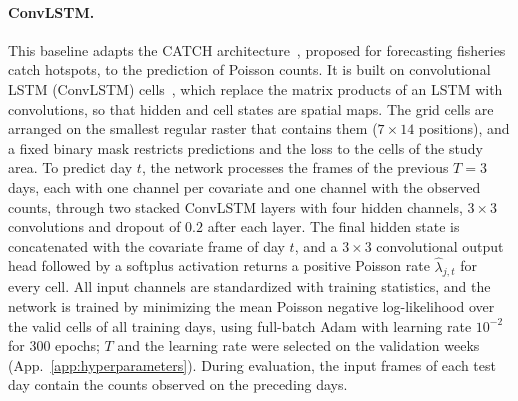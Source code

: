 \paragraph{ConvLSTM.}
This baseline adapts the CATCH architecture~\citep{agmata2025catch}, proposed for forecasting fisheries catch hotspots, to the prediction of Poisson counts. It is built on convolutional LSTM (ConvLSTM) cells~\citep{shi2015convolutional}, which replace the matrix products of an LSTM with convolutions, so that hidden and cell states are spatial maps. The grid cells are arranged on the smallest regular raster that contains them ($7\times14$ positions), and a fixed binary mask restricts predictions and the loss to the cells of the study area. To predict day $t$, the network processes the frames of the previous $T=3$ days, each with one channel per covariate and one channel with the observed counts, through two stacked ConvLSTM layers with four hidden channels, $3\times3$ convolutions and dropout of $0.2$ after each layer. The final hidden state is concatenated with the covariate frame of day $t$, and a $3\times3$ convolutional output head followed by a softplus activation returns a positive Poisson rate $\widehat{\lambda}_{j,t}$ for every cell. All input channels are standardized with training statistics, and the network is trained by minimizing the mean Poisson negative log-likelihood over the valid cells of all training days, using full-batch Adam with learning rate $10^{-2}$ for 300 epochs; $T$ and the learning rate were selected on the validation weeks (App.~\ref{app:hyperparameters}). During evaluation, the input frames of each test day contain the counts observed on the preceding days.
